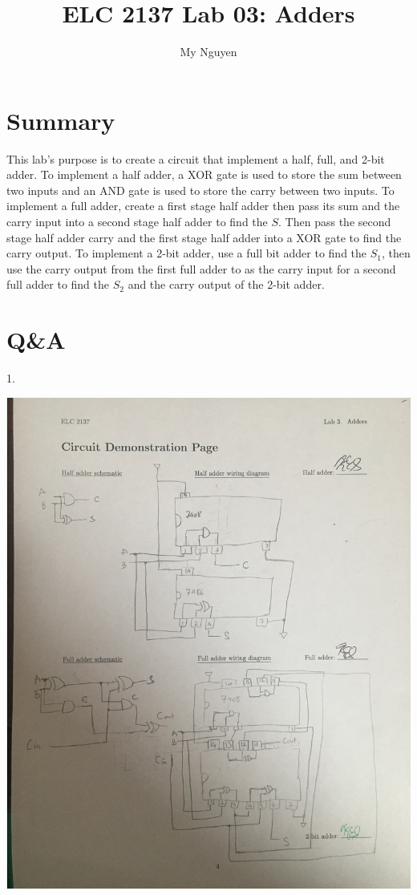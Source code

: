 \documentclass[11pt]{article}
\begin{document}
\title{ELC 2137 Lab 03: Adders}
\author{My Nguyen}

\maketitle

\section*{Summary}

This lab's purpose is to create a circuit that implement a half, full, and 2-bit adder. To implement a half adder, a XOR gate is used to store the sum between two inputs and an AND gate is used to store the carry between two inputs. To implement a full adder, create a first stage half adder then pass its sum and the carry input into a second stage half adder to find the $S$. Then pass the second stage half adder carry and the first stage half adder into a XOR gate to find the carry output. To implement a 2-bit adder, use a full bit adder to find the $S_1$, then use the carry output from the first full adder to as the carry input for a second full adder to find the $S_2$ and the carry output of the 2-bit adder.


\section*{Q\&A}
1.
\begin{center}
	\includegraphics[width=\textwidth]{"sheet"}
\end{center}
\end{document}
